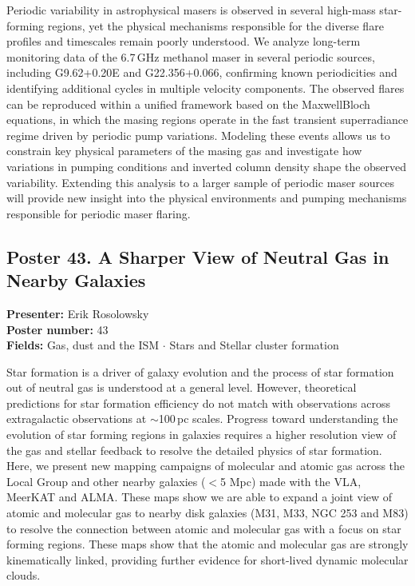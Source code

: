 Periodic variability in astrophysical masers is observed in several high-mass star-forming regions, yet the physical mechanisms responsible for the diverse flare profiles and timescales remain poorly understood. We analyze long-term monitoring data of the 6.7\,GHz methanol maser in several periodic sources, including G9.62+0.20E and G22.356+0.066, confirming known periodicities and identifying additional cycles in multiple velocity components. The observed flares can be reproduced within a unified framework based on the MaxwellBloch equations, in which the masing regions operate in the fast transient superradiance regime driven by periodic pump variations. Modeling these events allows us to constrain key physical parameters of the masing gas and investigate how variations in pumping conditions and inverted column density shape the observed variability. Extending this analysis to a larger sample of periodic maser sources will provide new insight into the physical environments and pumping mechanisms responsible for periodic maser flaring.

\hypertarget{poster-abstract-talk-258}{}\label{poster-abstract-page-talk-258}
\subsection*{Poster 43. A Sharper View of Neutral Gas in Nearby Galaxies}
\textbf{Presenter:} Erik Rosolowsky\\
\textbf{Poster number:} 43\\
\textbf{Fields:} Gas, dust and the ISM $\cdot$ Stars and Stellar cluster formation

Star formation is a driver of galaxy evolution and the process of star formation out of neutral gas is understood at a general level. However, theoretical predictions for star formation efficiency do not match with observations across extragalactic observations at $\sim$100\,pc scales. Progress toward understanding the evolution of star forming regions in galaxies requires a higher resolution view of the gas and stellar feedback to resolve the detailed physics of star formation. Here, we present new mapping campaigns of molecular and atomic gas across the Local Group and other nearby galaxies ($<$5 Mpc) made with the VLA, MeerKAT and ALMA. These maps show we are able to expand a joint view of atomic and molecular gas to nearby disk galaxies (M31, M33, NGC 253 and M83) to resolve the connection between atomic and molecular gas with a focus on star forming regions. These maps show that the atomic and molecular gas are strongly kinematically linked, providing further evidence for short-lived dynamic molecular clouds.

